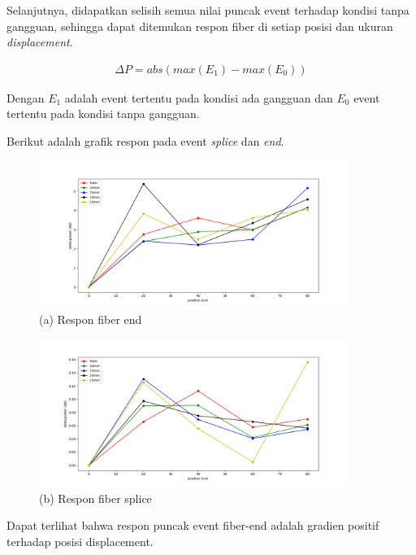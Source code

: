 \documentclass[12pt]{article}
\begin{document}
	Selanjutnya, didapatkan selisih semua nilai puncak event terhadap kondisi tanpa gangguan,
	sehingga dapat ditemukan respon fiber di setiap posisi dan ukuran \textit{displacement}.
	
	\begin{align}
		\Delta P = abs(max(E_1) - max(E_0))
	\end{align}
	
	Dengan $E_1$ adalah event tertentu pada kondisi ada gangguan dan $E_0$ event tertentu pada kondisi tanpa gangguan.
	
	Berikut adalah grafik respon pada event \textit{splice} dan \textit{end}.
	
	\begin{figure}[!ht]
		\centering
		\captionsetup{justification=centering}
		\includegraphics[width=0.9\textwidth]{images/Bab_4/Bab_4_5f1}	
		\caption{\small{(a) Respon fiber end}}
	\end{figure}
	
	\begin{figure}[!ht]
		\centering
		\captionsetup{justification=centering}
		\includegraphics[width=0.9\textwidth]{images/Bab_4/Bab_4_5f2}	
		\caption{\small{(b) Respon fiber splice}}
	\end{figure}

	\newpage
	Dapat terlihat bahwa respon puncak event fiber-end adalah gradien positif terhadap posisi displacement.
	
\end{document}
